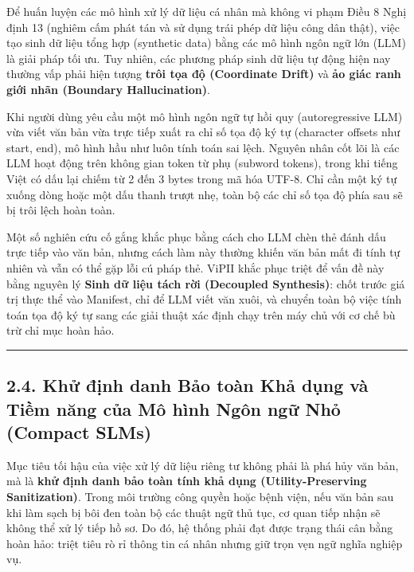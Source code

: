 \documentclass[
  11pt,
  a4paper,
]{article}
\begin{document}
Để huấn luyện các mô hình xử lý dữ liệu cá nhân mà không vi phạm Điều 8 Nghị định 13 (nghiêm cấm
phát tán và sử dụng trái phép dữ liệu công dân thật), việc tạo sinh dữ liệu tổng hợp (synthetic
data) bằng các mô hình ngôn ngữ lớn (LLM) là giải pháp tối ưu. Tuy nhiên, các phương pháp sinh dữ
liệu tự động hiện nay thường vấp phải hiện tượng \textbf{trôi tọa độ (Coordinate Drift)} và
\textbf{ảo giác ranh giới nhãn (Boundary Hallucination)}.

Khi người dùng yêu cầu một mô hình ngôn ngữ tự hồi quy (autoregressive LLM) vừa viết văn bản vừa
trực tiếp xuất ra chỉ số tọa độ ký tự (character offsets như start, end), mô hình hầu như luôn tính
toán sai lệch. Nguyên nhân cốt lõi là các LLM hoạt động trên không gian token từ phụ (subword
tokens), trong khi tiếng Việt có dấu lại chiếm từ 2 đến 3 bytes trong mã hóa UTF-8. Chỉ cần một ký
tự xuống dòng hoặc một dấu thanh trượt nhẹ, toàn bộ các chỉ số tọa độ phía sau sẽ bị trôi lệch hoàn
toàn.

Một số nghiên cứu cố gắng khắc phục bằng cách cho LLM chèn thẻ đánh dấu trực tiếp vào văn bản, nhưng
cách làm này thường khiến văn bản mất đi tính tự nhiên và vẫn có thể gặp lỗi cú pháp thẻ. ViPII khắc
phục triệt để vấn đề này bằng nguyên lý \textbf{Sinh dữ liệu tách rời (Decoupled Synthesis)}: chốt
trước giá trị thực thể vào Manifest, chỉ để LLM viết văn xuôi, và chuyển toàn bộ việc tính toán tọa
độ ký tự sang các giải thuật xác định chạy trên máy chủ với cơ chế bù trừ chỉ mục hoàn hảo.

\begin{center}\rule{0.5\linewidth}{0.5pt}\end{center}

\subsection{2.4. Khử định danh Bảo toàn Khả dụng và Tiềm năng của Mô hình Ngôn ngữ Nhỏ (Compact
SLMs)}\label{khux1eed-ux111ux1ecbnh-danh-bux1ea3o-touxe0n-khux1ea3-dux1ee5ng-vuxe0-tiux1ec1m-nux103ng-cux1ee7a-muxf4-huxecnh-nguxf4n-ngux1eef-nhux1ecf-compact-slms}

Mục tiêu tối hậu của việc xử lý dữ liệu riêng tư không phải là phá hủy văn bản, mà là \textbf{khử
định danh bảo toàn tính khả dụng (Utility-Preserving Sanitization)}. Trong môi trường công quyền
hoặc bệnh viện, nếu văn bản sau khi làm sạch bị bôi đen toàn bộ các thuật ngữ thủ tục, cơ quan tiếp
nhận sẽ không thể xử lý tiếp hồ sơ. Do đó, hệ thống phải đạt được trạng thái cân bằng hoàn hảo:
triệt tiêu rò rỉ thông tin cá nhân nhưng giữ trọn vẹn ngữ nghĩa nghiệp vụ.
\end{document}
